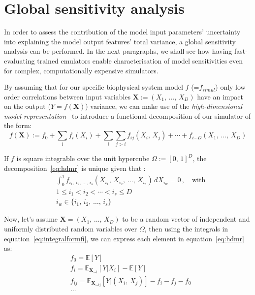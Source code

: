 %
%
%
\section{Global sensitivity analysis}\label{sec:ch3globalsensitivityanalysis}
In order to assess the contribution of the model input parameters' uncertainty into explaining the model output features' total variance, a global sensitivity analysis can be performed. In the next paragraphs, we shall see how having fast-evaluating trained emulators enable characterisation of model sensitivities even for complex, computationally expensive simulators.

\vspace{0.2cm}
By assuming that for our specific biophysical system model $f$ (=$f_{simul}$) only low order correlations between input variables $\mathbf{X}:=(X_1,\,\dots,\,X_D)$ have an impact on the output ($Y=f(\mathbf{X})$) variance, we can make use of the \textit{high-dimensional model representation}~\cite{Rabitz:1999} to introduce a functional decomposition of our simulator of the form:
%
\begin{equation}\label{eq:hdmr}
    f(\mathbf{X}) := f_{0} + \sum_{i}f_{i}(X_{i}) + \sum_{i}\sum_{j>i}f_{ij}(X_{i},\,X_{j}) + \cdots + f_{i\cdots D}(X_1,\,\dots,\,X_D)
\end{equation}

\noindent
If $f$ is square integrable over the unit hypercube $\Omega := [0,\,1]^{D}$, the decomposition~\eqref{eq:hdmr} is unique given that :
%
\begin{align}\label{eq:integralformfi}
    & \int_0^1 f_{i_1,\,i_2,\,\dots,\,i_s}(X_{i_1},\,X_{i_2},\,\dots,\,X_{i_s})\,dX_{i_{w}} = 0\,,\quad\text{with} \\
    & 1 \le i_1 < i_2 < \cdots < i_s \le D \\
    & i_{w} \in \{i_1,\,i_2,\,\dots,\,i_s\}
\end{align}

\noindent
Now, let's assume $\mathbf{X} = (X_1,\,\dots,\,X_D)$ to be a random vector of independent and uniformly distributed random variables over $\Omega$, then using the integrals in equation~\eqref{eq:integralformfi}, we can express each element in equation~\eqref{eq:hdmr} as:
%
\begin{align}
    & f_{0} = \mathbb{E}[Y] \label{eq:f0var}\\
    & f_{i} = \mathbb{E}_{\mathbf{X}_{\sim i}}[Y|X_i] - \mathbb{E}[Y] \\
    & f_{ij} = \mathbb{E}_{\mathbf{X}_{\sim ij}}[Y|(X_i,\,X_j)] - f_i - f_j - f_0 \\
    &\dots
\end{align}
 

